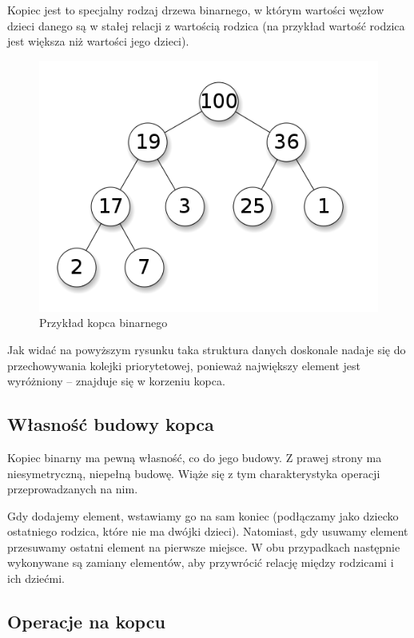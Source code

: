 \documentclass[12pt,a4paper]{article}
\begin{document}
Kopiec jest to specjalny rodzaj drzewa binarnego, w którym wartości węzłow dzieci danego są w stałej relacji z wartością rodzica (na przykład wartość rodzica jest większa niż wartości jego dzieci).

\begin{figure}[h]
	\centering
	\includegraphics[scale=0.5]{img/heap.png} 
	\caption{Przykład kopca binarnego}
\end{figure}

Jak widać na powyższym rysunku taka struktura danych doskonale nadaje się do przechowywania kolejki priorytetowej, ponieważ największy element jest wyróżniony -- znajduje się w korzeniu kopca.

\subsection{Własność budowy kopca}

Kopiec binarny ma pewną własność, co do jego budowy. Z prawej strony ma niesymetryczną, niepełną budowę. Wiąże się z tym charakterystyka operacji przeprowadzanych na nim.

Gdy dodajemy element, wstawiamy go na sam koniec (podłączamy jako dziecko ostatniego rodzica, które nie ma dwójki dzieci). Natomiast, gdy usuwamy element przesuwamy ostatni element na pierwsze miejsce. W obu przypadkach następnie wykonywane są zamiany elementów, aby przywrócić relację między rodzicami i ich dziećmi.

\subsection{Operacje na kopcu}
\end{document}
